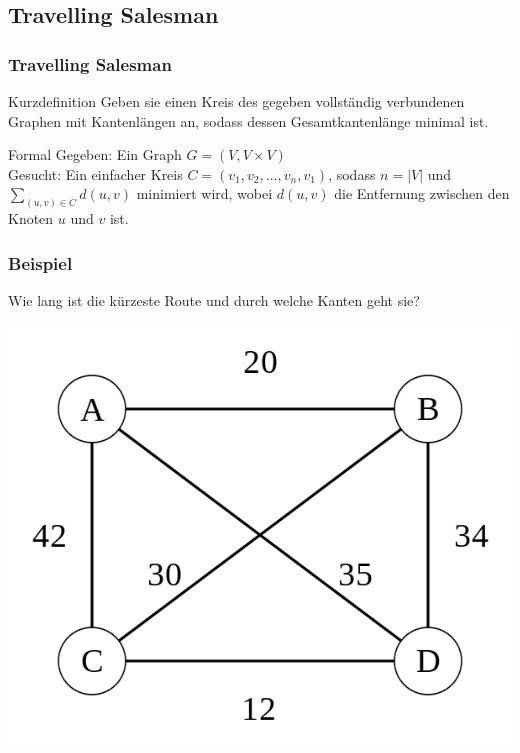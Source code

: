 \subsection{Travelling Salesman}
\begin{frame}
	\frametitle{Travelling Salesman}
	\begin{block}{Kurzdefinition}
	Geben sie einen Kreis des gegeben vollständig verbundenen Graphen mit Kantenlängen an, sodass dessen Gesamtkantenlänge minimal ist.
	\end{block}
	\begin{block}{Formal}
	Gegeben: Ein Graph $G=(V,V \times V)$\\
	Gesucht: Ein einfacher Kreis $C=(v_1,v_2,...,v_n,v_1)$, sodass $n=|V|$ und $\sum_{(u,v)\in C} d(u,v)$ minimiert wird, wobei $d(u,v)$ die Entfernung zwischen den Knoten $u$ und $v$ ist.\\
	\end{block}
\end{frame}
\begin{frame}
	\frametitle{Beispiel}
	Wie lang ist die kürzeste Route und durch welche Kanten geht sie?
	\begin{center}		
		\includegraphics[scale=0.5]{images/Weighted_K4}
	\end{center}
\end{frame}
